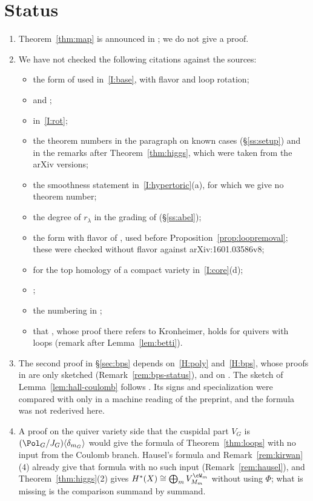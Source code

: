 \documentclass[11pt]{amsart}
\begin{document}
\section{Status}\label{sec:status}
\begin{enumerate}[leftmargin=2em]
\item Theorem~\ref{thm:map} is announced in \cite[Thm.~E]{bottaQuasimapCritical2026}; we do
not give a proof.
\item We have not checked the following citations against the sources:
\begin{itemize}[leftmargin=1.5em]
\item the form of \cite[Prop.~3.22]{BFN} used in~\ref{I:base}, with
flavor and loop rotation;
\item \cite{hauselCohomologyLarge2013} and \cite{greeneInterpretationWhitney1983};
\item \cite[Prop.~3.18]{bellamySymplecticResolutions2021} in~\ref{I:rot};
\item the theorem numbers in the paragraph on known cases (\S\ref{ss:setup}) and
in the remarks after Theorem~\ref{thm:higgs}, which were taken from the arXiv
versions;
\item the smoothness statement in~\ref{I:hypertoric}(a), for which we give
no theorem number;
\item the degree of $r_\lambda$ in the grading of \cite{BFN}
(\S\ref{ss:abel});
\item the form with flavor of \cite[Thm.~4.1, Lemma~5.17,
Prop.~6.6]{BFN}, used before Proposition~\ref{prop:loopremoval}; these
were checked without flavor against arXiv:1601.03586v8;
\item \cite[\S2.6]{CG97} for the top homology of a compact variety
in~\ref{I:core}(d);
\item \cite[Prop.~3.7.5]{kashiwaraSheavesManifolds1994};
\item the numbering in \cite{BBD};
\item that \cite[Thm.~4.1(2)]{nakajimaInstantonsALE1994}, whose proof there
refers to Kronheimer, holds for quivers with loops (remark after
Lemma~\ref{lem:betti}).
\end{itemize}
\item The second proof in \S\ref{sec:bps} depends on~\ref{H:poly}
and~\ref{H:bps}, whose proofs in \cite{jindalLoopNilpotent2026} are only
sketched (Remark~\ref{rem:bps-status}), and on .  The sketch
of Lemma~\ref{lem:hall-coulomb} follows .  Its signs and
specialization were compared with \cite{tsymbaliukDifferenceOperators2023}
only in a machine reading of the preprint, and the formula  was
not rederived here.
\item A proof on the quiver variety side that the cuspidal part $V_G$ is
$(\Pol_G/J_G)\langle\delta_{m_G}\rangle$ would give the formula of
Theorem~\ref{thm:loops} with no input from the Coulomb branch.  Hausel's
formula and Remark~\ref{rem:kirwan}(4) already give that formula with no such
input (Remark~\ref{rem:hausel}), and Theorem~\ref{thm:higgs}(2) gives
$H^*(X)\cong\bigoplus_mV_{M_m}^{\cW_m}$ without using $\Phi$; what is missing is
the comparison summand by summand.
\end{enumerate}

{\renewcommand{\markboth}[2]{}\printbibliography}
\end{document}
